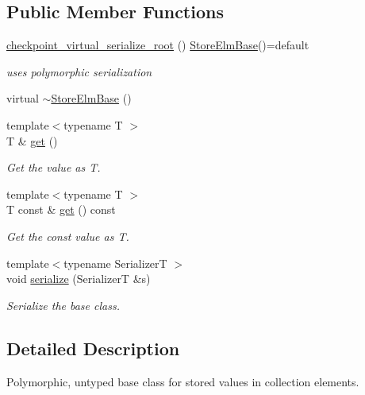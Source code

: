\subsection*{Public Member Functions}
\begin{DoxyCompactItemize}
\item 
\hyperlink{structvt_1_1vrt_1_1collection_1_1storage_1_1_store_elm_base_ac2c2e12a6f742e08b9d9771ebb26f08d}{checkpoint\+\_\+virtual\+\_\+serialize\+\_\+root} () \hyperlink{structvt_1_1vrt_1_1collection_1_1storage_1_1_store_elm_base}{Store\+Elm\+Base}()=default
\begin{DoxyCompactList}\small\item\em uses polymorphic serialization \end{DoxyCompactList}\item 
virtual \hyperlink{structvt_1_1vrt_1_1collection_1_1storage_1_1_store_elm_base_a564f20122fff98f72f65752ce610f05e}{$\sim$\+Store\+Elm\+Base} ()
\item 
{\footnotesize template$<$typename T $>$ }\\T \& \hyperlink{structvt_1_1vrt_1_1collection_1_1storage_1_1_store_elm_base_aa20aab1f18c5c993151f556d03296441}{get} ()
\begin{DoxyCompactList}\small\item\em Get the value as {\ttfamily T}. \end{DoxyCompactList}\item 
{\footnotesize template$<$typename T $>$ }\\T const  \& \hyperlink{structvt_1_1vrt_1_1collection_1_1storage_1_1_store_elm_base_aee7baa6c42334cd792c76888cd07cc18}{get} () const
\begin{DoxyCompactList}\small\item\em Get the const value as {\ttfamily T}. \end{DoxyCompactList}\item 
{\footnotesize template$<$typename SerializerT $>$ }\\void \hyperlink{structvt_1_1vrt_1_1collection_1_1storage_1_1_store_elm_base_a6552c32f1795ca501635036adc4e21d7}{serialize} (SerializerT \&s)
\begin{DoxyCompactList}\small\item\em Serialize the base class. \end{DoxyCompactList}\end{DoxyCompactItemize}


\subsection{Detailed Description}
Polymorphic, untyped base class for stored values in collection elements. 

